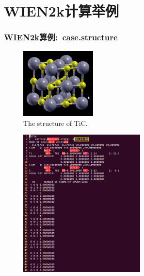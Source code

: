 \section{\rm{WIEN2k}计算举例}
\frame
{
	\frametitle{\textrm{WIEN2k}算例:~\textrm{case.structure}}
\vspace*{-18pt}
\begin{minipage}[t]{0.39\textwidth}
\begin{figure}[h!]
\centering
\includegraphics[width=1.5in]{Figures/WIEN2k_TiC.png}
\caption{\tiny \textrm{The structure of TiC.}}%
\label{Fig:WIEN2k_TiC}
\end{figure}
\end{minipage}
\hfill
\begin{minipage}[t]{0.59\textwidth}
\begin{figure}[h!]
\includegraphics[height=2.95in]{Figures/WIEN2k_TiC-structure.png}
\label{Fig:WIEN2k_TiC-structure}
\end{figure}
\end{minipage}
}

